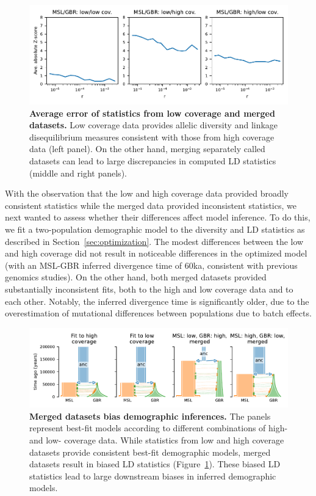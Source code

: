 \documentclass[]{article}
\begin{document}
\begin{figure}[ht!]
    \centering
    \includegraphics[width=5in]{figures/supp-SE-merged-data}
    \caption{
        \textbf{Average error of statistics from low coverage and merged datasets.}
        Low coverage data provides allelic diversity and linkage
        disequilibrium measures consistent with those from high coverage data (left panel). On the other hand,
        merging separately called datasets can lead to large discrepancies
        in computed LD statistics (middle and right panels).
    }
    \label{fig:supp-merged-data-SEs}
\end{figure}

With the observation that the low and high coverage data provided broadly
consistent statistics while the merged data provided inconsistent statistics,
we next wanted to assess whether their differences affect model inference. To
do this, we fit a two-population demographic model to the diversity and LD
statistics as described in Section~\ref{sec:optimization}. The modest
differences between the low and high coverage did not result in noticeable
differences in the optimized model (with an MSL-GBR inferred divergence time of
60ka, consistent with previous genomics studies). On the other hand, both
merged datasets provided substantially inconsistent fits, both to the high and
low coverage data and to each other. Notably, the inferred divergence time is
significantly older, due to the overestimation of mutational differences
between populations due to batch effects.

\begin{figure}[ht!]
    \centering
    \includegraphics{figures/supp-merged-data-model-fits}
    \caption{
        \textbf{Merged datasets bias demographic inferences.}
        The panels represent best-fit models according to 
        different combinations of high- and low- coverage data.
        While statistics from low and high coverage datasets provide consistent
        best-fit demographic models, merged datasets result in biased LD
        statistics (Figure~\ref{fig:supp-merged-data-SEs}). These biased LD
        statistics lead to large downstream biases in inferred demographic
        models. 
    }
    \label{fig:supp-merged-data-fits}
\end{figure}
\end{document}
